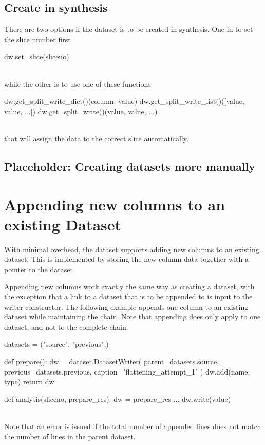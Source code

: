 \subsection{Create in synthesis}

There are two options if the dataset is to be created in synthesis.
One in to set the slice number first

\begin{python}
  dw.set_slice(sliceno)
\end{python}
\\
while the other is to use one of these functions

\begin{python}
  dw.get_split_write_dict()({column: value})
  dw.get_split_write_list()([value, value, ...])
  dw.get_split_write()(value, value, ...)
\end{python}
\\
that will assign the data to the correct slice automatically.

\subsection{Placeholder:  Creating datasets more manually}


\newpage
\section{Appending new columns to an existing Dataset}

With minimal overhead, the dataset supports adding new columns to an
existing dataset.  This is implemented by storing the new column data
together with a pointer to the dataset

Appending new columns work exactly the same way as creating a dataset,
with the exception that a link to a dataset that is to be appended to
is input to the writer constructor.  The following example appends one
column to an existing dataset while maintaining the chain.  Note that
appending does only apply to one dataset, and not to the complete
chain.

\begin{python}
datasets = ("source", "previous",)

def prepare():
  dw = dataset.DatasetWriter(
    parent=datasets.source,
    previous=datasets.previous,
    caption="flattening_attempt_1"
  )
  dw.add(name, type)
  return dw

def analysis(sliceno, prepare_res):
  dw = prepare_res
  ...
  dw.write(value)
\end{python}
\\
Note that an error is issued if the total number of appended lines
does not match the number of lines in the parent dataset.
